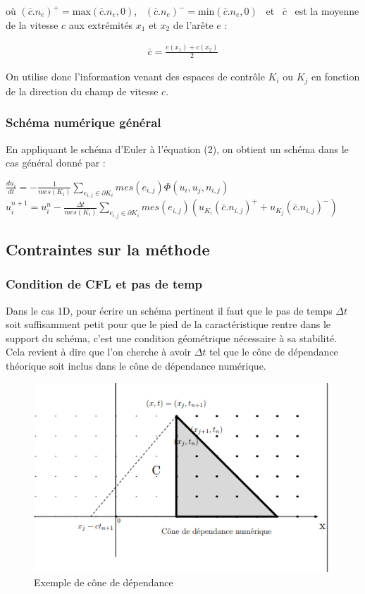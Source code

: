 \documentclass[12pt]{article}
\begin{document}
\noindent où $(\bar c.n_e)^+=\text{max}(\bar c.n_e,0)$, \, $(\bar c.n_e)^-=\text{min}(\bar c.n_e,0)$ \, et \, $\bar c$ \, est la moyenne de la vitesse $c$ aux extrémités $x_1$ et $x_2$ de l'arête $e$ :

\begin{eqnarray*}
       \bar c=\frac{c(x_1)+c(x_2)}{2}
\end{eqnarray*}

\noindent On utilise donc l'information venant des espaces de contrôle $K_i$ ou $K_j$ en fonction de la direction du champ de vitesse $c$.

\subsubsection{Schéma numérique général}
\noindent En appliquant le schéma d'Euler à l'équation (2), on obtient un schéma dans le cas général donné par :
\begin{center}
       $\displaystyle \frac{d u_i}{dt}=-\frac{1}{mes(K_i)} \displaystyle\sum_{e_{i,j} \in \partial K_i} mes(e_{i,j})\Phi(u_i,u_j,n_{i,j})$
       \\
       $u_i^{n+1}=u_i^n-\frac{\Delta t}{mes(K_i)} \displaystyle\sum_{e_{i,j}\in \partial K_i} mes(e_{i,j}) (u_{K_i}(\bar c.n_{i,j})^+ + u_{K_j}(\bar c.n_{i,j})^-)$
\end{center}
 
 \subsection{Contraintes sur la méthode}
 \subsubsection{Condition de CFL et pas de temp}
\noindent Dans le cas 1D, pour écrire un schéma pertinent il faut que le pas de temps $\Delta t$ soit suffisamment petit pour que le pied de la caractéristique rentre dans le support du schéma, c'est une condition géométrique nécessaire à sa stabilité.
 \\Cela revient à dire que l'on cherche à avoir $\Delta t$ tel que le cône de dépendance théorique soit inclus dans le cône de dépendance numérique.
 
 \begin{figure}[H]
	\centering
	\includegraphics[scale=0.7]{cone.png}
	\caption{Exemple de cône de dépendance}
	\label{1D}
	\end{figure}
	
\end{document}
